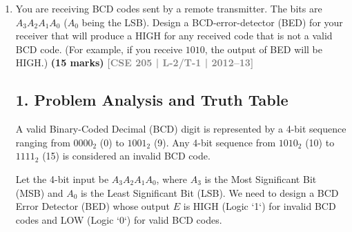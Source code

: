 \documentclass[12pt,a3paper]{article}
\newcommand{\yr}[1]{\hfill\textcolor{gray}{\small\textbf{[#1]}}}
\newcommand{\mk}[1]{\textcolor{orange!70!black}{\small\textbf{(#1 marks)}}}
\begin{document}
\begin{enumerate}
\begin{tcolorbox}[enhanced,breakable,ansbox,colback=cD!4,colframe=cD,boxrule=0.8pt,arc=5pt,title={\textbf{Answer}},fonttitle=\bfseries\color{white},colbacktitle=cD]
\end{tcolorbox}

\item You are receiving BCD codes sent by a remote transmitter. The bits are $A_3A_2A_1A_0$ ($A_0$ being the LSB). Design a BCD-error-detector (BED) for your receiver that will produce a HIGH for any received code that is not a valid BCD code. (For example, if you receive $1010$, the output of BED will be HIGH.)
\mk{15} \yr{CSE 205 | L-2/T-1 | 2012--13}

\begin{tcolorbox}[enhanced,breakable,ansbox,colback=cD!4,colframe=cD,boxrule=0.8pt,arc=5pt,title={\textbf{Answer}},fonttitle=\bfseries\color{white},colbacktitle=cD]

\subsection*{1. Problem Analysis and Truth Table}
A valid Binary-Coded Decimal (BCD) digit is represented by a 4-bit sequence ranging from $0000_2$ (0) to $1001_2$ (9). Any 4-bit sequence from $1010_2$ (10) to $1111_2$ (15) is considered an invalid BCD code. 

Let the 4-bit input be $A_3A_2A_1A_0$, where $A_3$ is the Most Significant Bit (MSB) and $A_0$ is the Least Significant Bit (LSB). We need to design a BCD Error Detector (BED) whose output $E$ is HIGH (Logic `1`) for invalid BCD codes and LOW (Logic `0`) for valid BCD codes.


\end{tcolorbox}
\end{enumerate}
\end{document}
